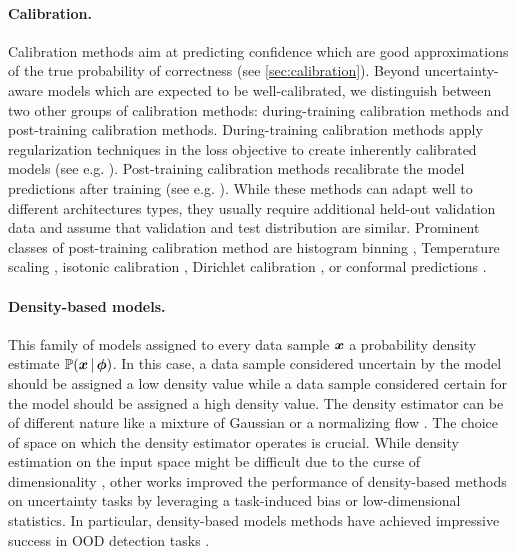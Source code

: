 \paragraph*{Calibration.} Calibration methods aim at predicting confidence which are good approximations of the true probability of correctness (see \cref{sec:calibration}). Beyond uncertainty-aware models which are expected to be well-calibrated, we distinguish between two other groups of calibration methods: during-training calibration methods and post-training calibration methods. During-training calibration methods apply regularization techniques in the loss objective to create inherently calibrated models (see e.g. \cite{lee2018training,corbieres2019confidence,minderer2021revisiting}). Post-training calibration methods recalibrate the model predictions after training (see e.g. \cite{calibration-network,wenger201calibration}). While these methods can adapt well to different architectures types, they usually require additional held-out validation data and assume that validation and test distribution are similar. Prominent classes of post-training calibration method are histogram binning \cite{zadrozny2001calibrated}, Temperature scaling \cite{calibration-network}, isotonic calibration \cite{zadrozny2002transforming}, Dirichlet calibration \cite{kull2019beyond}, or conformal predictions \cite{conformal-survey,marx2022conformal}.

\paragraph*{Density-based models.} This family of models assigned to every data sample $\bm{x}$ a probability density estimate $\mathbb{P}(\bm{x} \,|\, \bm{\phi})$. In this case, a data sample considered uncertain by the model should be assigned a low density value while a data sample considered certain for the model should be assigned a high density value. The density estimator can be of different nature like a mixture of Gaussian \cite{simple_ood_adv_detection,du2022vos} or a normalizing flow \cite{nf-review,why-nf-fail-ood,postels2020hiddenuncertainty}. The choice of space on which the density estimator operates is crucial. While density estimation on the input space might be difficult due to the curse of dimensionality \citep{anomaly-detection,deep-generative,typicality_OOD_generative}, other works \cite{charpentier2020, why-nf-fail-ood, density-states-ood, contrastive-ood} improved the performance of density-based methods on uncertainty tasks by leveraging a task-induced bias or low-dimensional statistics. In particular, density-based models methods have achieved impressive success in OOD detection tasks \cite{ood-detection-survey}.

